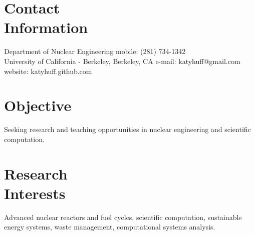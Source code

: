 \documentclass[margin,line]{resume}
\begin{document}
\begin{resume}

    \section{\mysidestyle Contact\\Information}

    Department of Nuclear Engineering                       \hfill mobile: (281) 734-1342           \vspace{0mm}\\\vspace{0mm}%
    University of California - Berkeley, Berkeley, CA       \hfill e-mail: katyhuff@gmail.com            \vspace{0mm}\\\vspace{0mm}%
                                                            \hfill website: katyhuff.github.com     \vspace{0mm}\\\vspace{-4.5mm}%

    \section{\mysidestyle Objective}
		Seeking research and teaching opportunities in nuclear engineering and scientific computation.%
    \section{\mysidestyle Research\\Interests}
		Advanced nuclear reactors and fuel cycles, scientific 
                computation, sustainable energy systems, waste 
                management, computational systems analysis. %

\end{resume}
\end{document}
